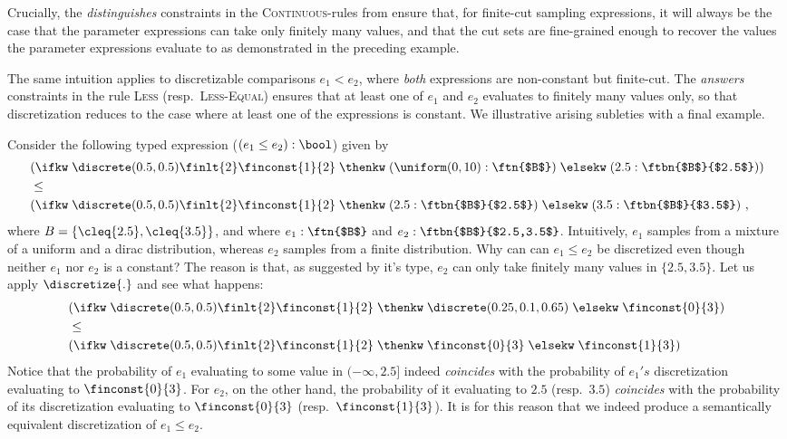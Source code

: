 %
Crucially, the \emph{distinguishes} constraints in the \textsc{Continuous}-rules from  ensure that, for finite-cut sampling expressions, it will always be the case that the parameter expressions can take only finitely many values, and that the cut sets are fine-grained enough to recover the values the parameter expressions evaluate to as demonstrated in the preceding example.

The same intuition applies to discretizable comparisons $e_1 < e_2$, where \emph{both} expressions are non-constant but finite-cut. The \emph{answers} constraints in the rule \textsc{Less} (resp.\ \textsc{Less-Equal}) ensures that at least one of $e_1$ and $e_2$ evaluates to finitely many values only, so that discretization reduces to the case where at least one of the expressions is constant. We illustrative arising subleties with a final example.
%
\begin{example}
	Consider the following typed expression ($(e_1 \leq e_2) : \bool$) given by
	\begin{align*}
		&(\ifkw\;\discrete(0.5,0.5) \finlt{2} \finconst{1}{2} \; \thenkw \; 
		(\uniform(0,10) : \text{\ftn{$B$}})
		\; \elsekw \; (2.5 : \text{\ftbn{$B$}{$2.5$}})) \\
		&\leq \\
		&(\ifkw\;\discrete(0.5,0.5) \finlt{2} \finconst{1}{2} \; \thenkw \; 
		(2.5 : \text{\ftbn{$B$}{$2.5$}})
		 \; \elsekw \; 
		 (3.5 : \text{\ftbn{$B$}{$3.5$}})~,
	\end{align*}
	where $B = \{\cleq{2.5}, \cleq{3.5}\}$, and where $e_1 : \text{\ftn{$B$}}$ and $e_2 : \text{\ftbn{$B$}{$2.5,3.5$}}$. Intuitively, $e_1$ samples from a mixture of a uniform and a dirac distribution, whereas $e_2$ samples from a finite distribution. Why can can $e_1 \leq e_2$ be discretized even though neither $e_1$ nor $e_2$ is a constant? The reason is that, as suggested by it's type, $e_2$ can only take finitely many values in $\{2.5,3.5\}$. Let us apply $\discretize{.}$ and see what happens:
	\begin{align*}
		&(\ifkw \; \discrete(0.5,0.5) \finlt{2} \finconst{1}{2} \; \thenkw \; \discrete(0.25,0.1,0.65) \; \elsekw \; \finconst{0}{3})\\
		&\leq \\
		& (\ifkw \; \discrete(0.5,0.5) \finlt{2} \finconst{1}{2} \; \thenkw \;  \finconst{0}{3} \; \elsekw \; \finconst{1}{3})
	\end{align*}
	Notice that the probability of $e_1$ evaluating to some value in $(-\infty, 2.5]$ indeed \emph{coincides} with the probability of $e_1's$ discretization evaluating to $\finconst{0}{3}$. For $e_2$, on the other hand, the probability of it evaluating to $2.5$ (resp.\ $3.5$) \emph{coincides} with the probability of its discretization evaluating to $\finconst{0}{3}$ (resp.\ $\finconst{1}{3}$). It is for this reason that we indeed produce a semantically equivalent discretization of $e_1 \leq e_2$.
\end{example}




